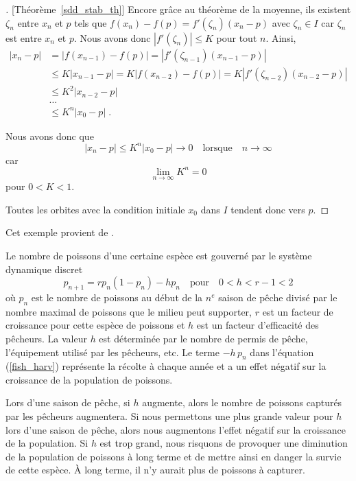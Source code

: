 {\begin{proof}[\theory][Théorème~\ref{sdd_stab_th}]
 Encore grâce au théorème de la moyenne, ils existent $\zeta_n$
entre $x_n$ et $p$ tels que
$f(x_n) - f(p) = f'(\zeta_n)(x_n - p)$
avec $\zeta_n \in I$ car $\zeta_n$ est entre $x_n$ et $p$.  Nous avons donc
$|f'(\zeta_n)|\leq K$ pour tout $n$.  Ainsi,
\begin{align*}
|x_n -p| &= |f(x_{n-1}) - f(p)| = |f'(\zeta_{n-1})(x_{n-1} - p)|\\
&\leq K |x_{n-1} - p| = K |f(x_{n-2}) - f(p)|
= K |f'(\zeta_{n-2})(x_{n-2} - p)| \\
&\leq K^2 |x_{n-2} -p|\\
& \ldots\\
&\leq K^n |x_0 - p| \; .
\end{align*}

 Nous avons donc que
\[
|x_n -p| \leq K^n |x_0-p|  \to 0 \quad \text{lorsque} \quad n \to \infty
\]
car
\[
\lim_{n\rightarrow \infty} K^n = 0
\]
pour $0<K<1$.

Toutes les orbites avec la condition initiale $x_0$ dans $I$
tendent donc vers $p$.
\end{proof}

\begin{egg}
Cet exemple provient de \cite{A}.

Le nombre de poissons d'une certaine espèce est gouverné par le
système dynamique discret
\begin{equation}\label{fish_harv}
p_{n+1} = r p_n (1-p_n) - h p_n  \quad \text{pour} \quad  0 < h < r
-1 < 2 
\end{equation}
où $p_n$ est le nombre de poissons au début de la $n^e$ saison de
pêche divisé par le nombre maximal de poissons que le milieu peut
supporter, $r$ est un facteur de croissance pour cette espèce de
poissons et $h$ est un facteur d'efficacité des pêcheurs. La valeur
$h$ est déterminée par le nombre de permis de pêche, l'équipement
utilisé par les pêcheurs, etc.  Le terme $-h\,p_n$ dans l'équation
(\ref{fish_harv}) représente la récolte à chaque année et a un effet
négatif sur la croissance de la population de poissons.

Lors d'une saison de pêche, si $h$ augmente, alors le nombre de
poissons capturés par les pêcheurs augmentera.  Si nous permettons une plus
grande valeur pour $h$ lors d'une saison de pêche, alors nous augmentons
l'effet négatif sur la croissance de la population.  Si $h$ est trop
grand, nous risquons de provoquer une diminution de la population de
poissons à long terme et de mettre ainsi en danger la survie de
cette espèce.  À long terme, il n'y aurait plus de poissons à capturer.


\end{egg}}
